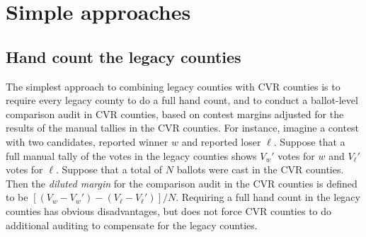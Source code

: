 \documentclass[runningheads]{llncs}
\begin{document}
\section{Simple approaches} \label{sec:crude}

\subsection{Hand count the legacy counties}
The simplest approach to combining legacy counties with CVR counties is to require every
legacy county to do a full hand count, and to conduct a 
ballot-level comparison audit in CVR counties, based on contest margins adjusted for
the results of the manual tallies in the CVR counties.
For instance, imagine a contest with two candidates, reported winner $w$ and reported loser $\ell$.
Suppose that a full manual tally of the votes in the legacy counties shows $V_w'$ votes for $w$ and
$V_\ell'$ votes for $\ell$.
Suppose that a total of $N$ ballots were cast in the CVR counties.
Then the \emph{diluted margin}  for the comparison audit in the CVR counties is defined to be
$[(V_w-V_w')-(V_\ell-V_\ell')]/N$.
Requiring a full hand count in the legacy counties has obvious disadvantages,
but does not force CVR counties to do additional auditing to compensate for the legacy counties.
\end{document}
